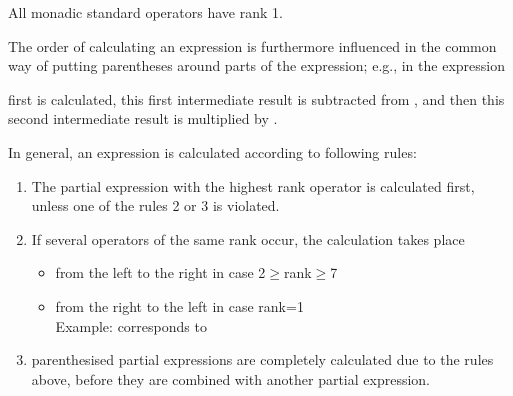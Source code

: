 All monadic standard operators have rank 1.

The order of calculating an expression is furthermore influenced in the
common way of putting parentheses around parts of the expression; e.g.,
in the expression


first  is calculated, this first intermediate result is subtracted
from , and then this second intermediate result is multiplied by 
.

In general, an expression is calculated according to following rules:
\begin{enumerate}
\item The partial expression with the highest rank operator is
calculated first, unless one of the rules 2 or 3 is violated.
\item If several operators of the same rank occur, the calculation takes
place
\begin{itemize}
\item from the left to the right in case 2$\ge$rank$\ge$7
\item from the right to the left in case rank=1\\
      Example:  corresponds to 
\end{itemize}
\item parenthesised partial expressions are completely calculated due to
the rules above, before they are combined with another partial
expression.
\end{enumerate}

